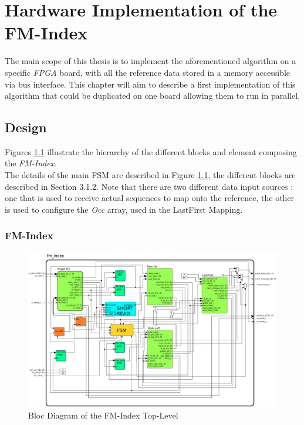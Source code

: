 
\chapter{Hardware Implementation of the FM-Index} %

\label{Chapter3} %
The main scope of this thesis is to implement the aforementioned algorithm on a specific \textsl{FPGA} board, with all the reference data stored in a memory accessible via bus interface. This chapter will aim to describe a first implementation of this algorithm that could be duplicated on one board allowing them to run in parallel.

\section{Design}

Figures \ref{fig:seqschema} illustrate the hierarchy of the different blocks and element composing the \textsl{FM-Index}. \\

The details of the main FSM are described in Figure \ref{fig:seqschema}, the different blocks are described in Section 3.1.2. Note that there are two different data input sources : one that is used to receive actual sequences to map onto the reference, the other is used to configure the \textsl{Occ} array, used in the LastFirst Mapping.

\subsection{FM-Index}

\begin{figure}[H]   
    \centering
    \hspace*{-20mm}\includegraphics[scale = 0.45]{Figures/fmindex_top.png}
    \caption{Bloc Diagram of the FM-Index Top-Level}
    \label{fig:seqschema}
\end{figure}

